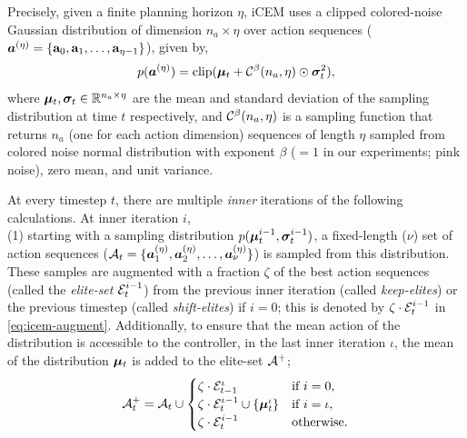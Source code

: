 Precisely, given a finite planning horizon \(\eta\), iCEM uses a clipped colored-noise Gaussian distribution of dimension \(n_a \times \eta\) over action sequences (\(\bm{a}^{(\eta)} = \{ \mathbf{a}_0, \mathbf{a}_1, \ldots, \mathbf{a}_{\eta-1} \}\)), given by,
\begin{equation}
    \label{eq:icem-distribution}
    p(\bm{a}^{(\eta)}) = \text{clip}(\bm{\mu}_t + \mathcal{C}^\beta(n_a, \eta) \odot \bm{\sigma}_t^2),
\end{equation}
where \(\bm{\mu}_{t}, \bm{\sigma}_{t} \in \mathbb{R}^{n_a \times \eta}\) are the mean and standard deviation of the sampling distribution at time \(t\) respectively, and \(\mathcal{C}^\beta(n_a, \eta)\) is a sampling function that returns \(n_a\) (one for each action dimension) sequences of length \(\eta\) sampled from colored noise normal distribution with exponent \(\beta\) (\(= 1\) in our experiments; pink noise), zero mean, and unit variance.

At every timestep \(t\), there are multiple \emph{inner} iterations of the following calculations.
At inner iteration \(i\),\\
(1) starting with a sampling distribution \( p(\bm{\mu}_{t}^{i - 1},\bm{\sigma}_{t}^{i - 1})\), a fixed-length (\(\nu\)) set of action sequences (\(\mathcal{A}_t = \{ \bm{a}^{(\eta)}_1, \bm{a}^{(\eta)}_2, \ldots, \bm{a}^{(\eta)}_{\nu} \}\)) is sampled from this distribution.
These samples are augmented with a fraction \(\zeta\) of the best action sequences (called the \emph{elite-set} \(\mathcal{E}_t^{i - 1}\)) from the previous inner iteration (called \emph{keep-elites}) or the previous timestep (called \emph{shift-elites}) if \(i = 0\); this is denoted by \(\zeta \cdot \mathcal{E}_t^{i - 1}\) in \eqref{eq:icem-augment}. 
Additionally, to ensure that the mean action of the distribution is accessible to the controller, in the last inner iteration \(\iota\), the mean of the distribution \(\bm{\mu}_t\) is added to the elite-set \(\mathcal{A}^+\);
\begin{equation}
    \label{eq:icem-augment}
    \mathcal{A}^+_t = \mathcal{A}_t \cup \begin{cases}
            \zeta \cdot \mathcal{E}_{t - 1}^\iota & \text{if } i = 0,\\
            \zeta \cdot \mathcal{E}_t^{\iota - 1} \cup \{ \bm{\mu}_t^\iota \} & \text{if } i = \iota,\\
            \zeta \cdot \mathcal{E}_t^{i - 1} & \text{otherwise}.
    \end{cases}
\end{equation}

